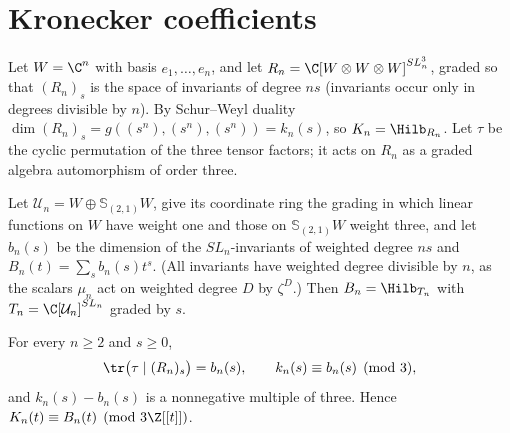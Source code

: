 \section{Kronecker coefficients}\label{sec:kronecker}

Let $W=\C^n$ with basis $e_1,\dots,e_n$, and let $R_n=\C[W\otimes W\otimes W]
^{SL_n^3}$, graded so that $(R_n)_s$ is the space of invariants of degree $ns$
(invariants occur only in degrees divisible by $n$). By Schur--Weyl duality
$\dim(R_n)_s=g((s^n),(s^n),(s^n))=k_n(s)$, so $K_n=\Hilb_{R_n}$. Let $\tau$ be
the cyclic permutation of the three tensor factors; it acts on $R_n$ as a
graded algebra automorphism of order three.

Let $\mathcal U_n=W\oplus\mathbb S_{(2,1)}W$, give its coordinate ring the
grading in which linear functions on $W$ have weight one and those on
$\mathbb S_{(2,1)}W$ weight three, and let $b_n(s)$ be the dimension of the
$SL_n$-invariants of weighted degree $ns$ and $B_n(t)=\sum_sb_n(s)t^s$. (All
invariants have weighted degree divisible by $n$, as the scalars $\mu_n$ act
on weighted degree $D$ by $\zeta^D$.) Then $B_n=\Hilb_{T_n}$ with
$T_n=\C[\mathcal U_n]^{SL_n}$ graded by $s$.

\begin{theorem}\label{thm:K023}
For every $n\ge2$ and $s\ge0$,
\[
 \tr\bigl(\tau\mid(R_n)_s\bigr)=b_n(s),\qquad k_n(s)\equiv b_n(s)\pmod3 ,
\]
and $k_n(s)-b_n(s)$ is a nonnegative multiple of three. Hence
$K_n(t)\equiv B_n(t)\pmod{3\Z[[t]]}$.
\end{theorem}

